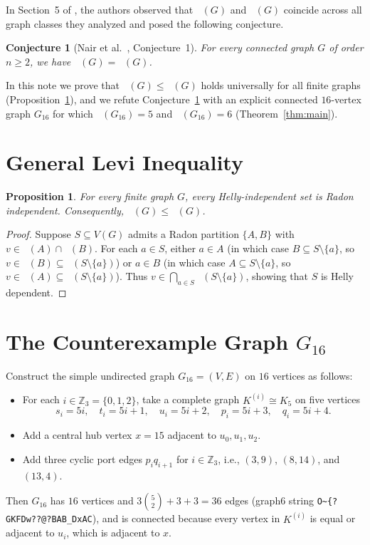 \documentclass[11pt,a4paper]{article}
\newtheorem{proposition}[theorem]{Proposition}
\newtheorem{conjecture}[theorem]{Conjecture}
\DeclareMathOperator{\hl}{hl_{cc}}
\DeclareMathOperator{\rd}{rd_{cc}}
\DeclareMathOperator{\Hull}{Hull_{cc}}
\begin{document}
In Section~5 of \cite{Nair2026}, the authors observed that $\hl(G)$ and $\rd(G)$ coincide across all graph classes they analyzed and posed the following conjecture.

\begin{conjecture}[Nair et al.~\cite{Nair2026}, Conjecture~1]\label{conj:main}
For every connected graph $G$ of order $n \ge 2$, we have $\hl(G) = \rd(G)$.
\end{conjecture}

In this note we prove that $\hl(G) \le \rd(G)$ holds universally for all finite graphs (Proposition~\ref{prop:levi}), and we refute Conjecture~\ref{conj:main} with an explicit connected $16$-vertex graph $G_{16}$ for which $\hl(G_{16}) = 5$ and $\rd(G_{16}) = 6$ (Theorem~\ref{thm:main}).

\section{General Levi Inequality}

\begin{proposition}\label{prop:levi}
For every finite graph $G$, every Helly-independent set is Radon independent. Consequently, $\hl(G) \le \rd(G)$.
\end{proposition}

\begin{proof}
Suppose $S \subseteq V(G)$ admits a Radon partition $\{A, B\}$ with $v \in \Hull(A) \cap \Hull(B)$. For each $a \in S$, either $a \in A$ (in which case $B \subseteq S \setminus \{a\}$, so $v \in \Hull(B) \subseteq \Hull(S \setminus \{a\})$) or $a \in B$ (in which case $A \subseteq S \setminus \{a\}$, so $v \in \Hull(A) \subseteq \Hull(S \setminus \{a\})$). Thus $v \in \bigcap_{a \in S} \Hull(S \setminus \{a\})$, showing that $S$ is Helly dependent.
\end{proof}

\section{The Counterexample Graph $G_{16}$}

Construct the simple undirected graph $G_{16} = (V, E)$ on $16$ vertices as follows:
\begin{itemize}
\item For each $i \in \mathbb{Z}_3 = \{0, 1, 2\}$, take a complete graph $K^{(i)} \cong K_5$ on five vertices
\[
s_i = 5i, \quad t_i = 5i+1, \quad u_i = 5i+2, \quad p_i = 5i+3, \quad q_i = 5i+4.
\]
\item Add a central hub vertex $x = 15$ adjacent to $u_0, u_1, u_2$.
\item Add three cyclic port edges $p_i q_{i+1}$ for $i \in \mathbb{Z}_3$, i.e., $(3, 9)$, $(8, 14)$, and $(13, 4)$.
\end{itemize}
Then $G_{16}$ has $16$ vertices and $3\binom{5}{2} + 3 + 3 = 36$ edges (graph6 string \texttt{O\~{}\{?GKFDw??@?BAB\_DxAC}), and is connected because every vertex in $K^{(i)}$ is equal or adjacent to $u_i$, which is adjacent to $x$.
\end{document}
